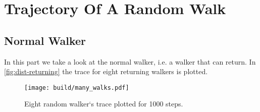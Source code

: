 \documentclass{article}
\begin{document}
\section{Trajectory Of A Random Walk}
\label{sec:Trajectory Of A Random Walk}

\subsection{Normal Walker}
\label{sec:Normal Walker}
In this part we take a look at the normal walker, i.e. a walker that can return.
In \autoref{fig:dist-returning} the trace for eight returning walkers is plotted. 
\begin{figure}[H]
	\centering
	\texttt{[image: build/many\_walks.pdf]}
	\caption{Eight random walker`s trace plotted for 1000 steps.}
  \label{fig:dist-returning}
\end{figure}
\end{document}
